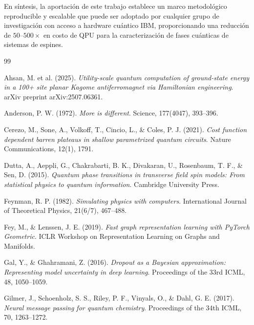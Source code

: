 \documentclass[11pt,a4paper,spanish]{book}
\begin{document}
En síntesis, la aportación de este trabajo establece un marco metodológico reproducible y escalable que puede ser adoptado por cualquier grupo de investigación con acceso a hardware cuántico IBM, proporcionando una reducción de $50$--$500\times$ en costo de QPU para la caracterización de fases cuánticas de sistemas de espines.



\begin{thebibliography}{99}

 Ahsan, M. et al. (2025). \emph{Utility-scale quantum computation of ground-state energy in a 100+ site planar Kagome antiferromagnet via Hamiltonian engineering}. arXiv preprint arXiv:2507.06361.

 Anderson, P. W. (1972). \emph{More is different}. Science, 177(4047), 393--396.

 Cerezo, M., Sone, A., Volkoff, T., Cincio, L., \& Coles, P. J. (2021). \emph{Cost function dependent barren plateaus in shallow parametrized quantum circuits}. Nature Communications, 12(1), 1791.

 Dutta, A., Aeppli, G., Chakrabarti, B. K., Divakaran, U., Rosenbaum, T. F., \& Sen, D. (2015). \emph{Quantum phase transitions in transverse field spin models: From statistical physics to quantum information}. Cambridge University Press.

 Feynman, R. P. (1982). \emph{Simulating physics with computers}. International Journal of Theoretical Physics, 21(6/7), 467--488.

 Fey, M., \& Lenssen, J. E. (2019). \emph{Fast graph representation learning with PyTorch Geometric}. ICLR Workshop on Representation Learning on Graphs and Manifolds.

 Gal, Y., \& Ghahramani, Z. (2016). \emph{Dropout as a Bayesian approximation: Representing model uncertainty in deep learning}. Proceedings of the 33rd ICML, 48, 1050--1059.

 Gilmer, J., Schoenholz, S. S., Riley, P. F., Vinyals, O., \& Dahl, G. E. (2017). \emph{Neural message passing for quantum chemistry}. Proceedings of the 34th ICML, 70, 1263--1272.


\end{thebibliography}
\end{document}
